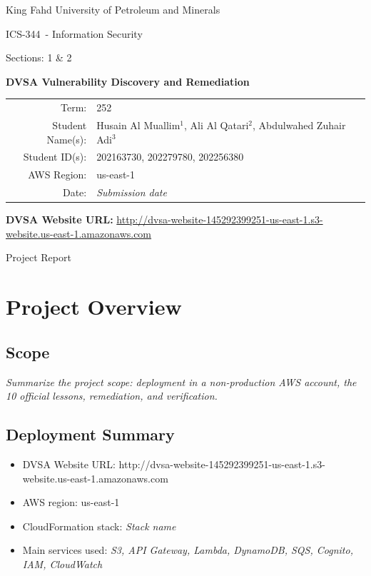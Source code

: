 \documentclass[12pt]{report}
\newcommand{\placeholder}[1]{\textcolor{placeholdergray}{\textit{#1}}}
\newcommand{\CourseCode}{ICS-344}
\newcommand{\CourseTitle}{Information Security}
\newcommand{\CourseSection}{Sections: 1 \& 2}
\newcommand{\CourseTerm}{252}
\newcommand{\ProjectTitle}{DVSA Vulnerability Discovery and Remediation}
\newcommand{\StudentNames}{Husain Al Muallim$^1$, Ali Al Qatari$^2$, Abdulwahed Zuhair Adi$^3$}
\newcommand{\StudentIDs}{202163730, 202279780, 202256380}
\newcommand{\DVSAWebsiteURL}{http://dvsa-website-145292399251-us-east-1.s3-website.us-east-1.amazonaws.com}
\newcommand{\AWSRegion}{us-east-1}
\newcommand{\SubmissionDate}{\placeholder{Submission date}}
\begin{document}
\hypersetup{pageanchor=false}
\begin{titlepage}
  \centering
  {\Large King Fahd University of Petroleum and Minerals\par}
  \vspace{1.2cm}
  {\Large \CourseCode\ - \CourseTitle\par}
  {\large \CourseSection\par}
  \vspace{1.4cm}
  {\huge \bfseries \ProjectTitle\par}
  \vspace{1.4cm}

  \begin{tabularx}{\textwidth}{@{}rY@{}}
    Term: & \CourseTerm \\
    Student Name(s): & \StudentNames \\
    Student ID(s): & \StudentIDs \\
    AWS Region: & \AWSRegion \\
    Date: & \SubmissionDate \\
  \end{tabularx}

  \vspace{0.6cm}
  {\small\textbf{DVSA Website URL:} \url{\DVSAWebsiteURL}\par}

  \vfill
  {\large Project Report\par}
\end{titlepage}

\clearpage
\hypersetup{pageanchor=true}
\tableofcontents
\clearpage

\chapter*{Project Overview}

\section*{Scope}
\placeholder{Summarize the project scope: deployment in a non-production AWS account, the 10 official lessons, remediation, and verification.}

\section*{Deployment Summary}
\begin{itemize}
  \item DVSA Website URL: \DVSAWebsiteURL
  \item AWS region: \AWSRegion
  \item CloudFormation stack: \placeholder{Stack name}
  \item Main services used: \placeholder{S3, API Gateway, Lambda, DynamoDB, SQS, Cognito, IAM, CloudWatch}
\end{itemize}
\end{document}
